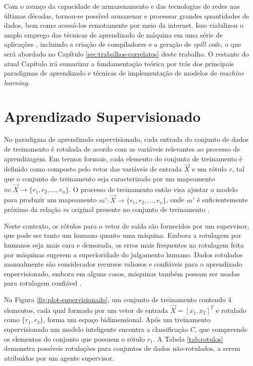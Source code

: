 \documentclass[
	12pt,				%
	openright,			%
	oneside,			%
	a4paper,			%
	tccpreliminar,			%
	]{ABNT-DC-UEL}
\begin{document}
Com o avanço da capacidade de armazenamento e das tecnologias de redes nas últimas décadas, tornou-se possível armazenar e processar grandes quantidades de dados, bem como acessá-los remotamente por meio da internet. Isso viabilizou o amplo emprego das técnicas de aprendizado de máquina em uma série de aplicações \cite{alpaydin:20, sharma:21}, incluindo a criação de compiladores e a geração de \textit{spill code}, o que será abordado no Capítulo \ref{sec:trabalhos-correlatos} deste trabalho. O restante do atual Capítulo irá sumarizar a fundamentação teórica por trás dos principais paradigmas de aprendizado e técnicas de implementação de modelos de \textit{machine learning}.

\section{Aprendizado Supervisionado}

No paradigma de aprendizado supervisionado, cada entrada do conjunto de dados de treinamento é rotulada de acordo com as variáveis relevantes ao processo de aprendizagem. Em termos formais, cada elemento do conjunto de treinamento é definido como composto pelo vetor das variáveis de entrada $\Vec{X}$ e um rótulo $r$, tal que o conjunto de treinamento seja caracterizado por um mapeamento $m : \Vec{X} \to \{r_1, r_2, \dots, r_n\}$. O processo de treinamento então visa ajustar o modelo para produzir um mapeamento $m' : \Vec{X} \to \{r_1, r_2, \dots, r_n\}$, onde $m'$ é suficientemente próximo da relação $m$ original presente no conjunto de treinamento \cite{mohammed:16, alpaydin:20}.

Neste contexto, os rótulos para o vetor de saída são fornecidos por um supervisor, que pode ser tanto um humano quanto uma máquina. Embora a rotulagem por humanos seja mais cara e demorada, os erros mais frequentes na rotulagem feita por máquinas sugerem a superioridade do julgamento humano. Dados rotulados manualmente são considerados recursos valiosos e confiáveis para o aprendizado supervisionado, embora em alguns casos, máquinas também possam ser usadas para rotulagem confiável \cite{mohammed:16}.

Na Figura \ref{fig:plot-supervisionado}, um conjunto de treinamento contendo 4 elementos, cada qual formado por um vetor de entrada $\Vec{X} = [x_1,x_2]^T$ e rotulado como $\{r_1, r_2\}$, forma um espaço bidimensional. Após um treinamento supervisionado um modelo inteligente encontra a classificação $C$, que compreende os elementos do conjunto que possuem o rótulo $r_1$. A Tabela \ref{tab:rotulos} demonstra possíveis rotulações para conjuntos de dados não-rotulados, a serem atribuídos por um agente supervisor.
\end{document}
